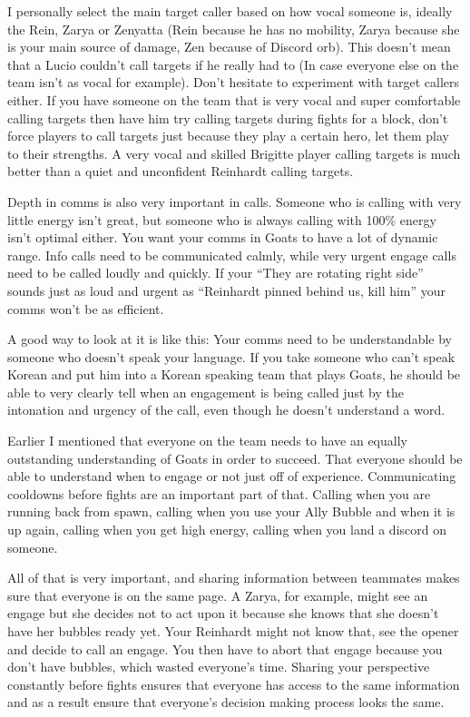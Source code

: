 I personally select the main target caller based on how vocal someone is, ideally the Rein, Zarya or Zenyatta (Rein because he has no mobility, Zarya because she is your main source of damage, Zen because of Discord orb). This doesn’t mean that a Lucio couldn’t call targets if he really had to (In case everyone else on the team isn’t as vocal for example). Don’t hesitate to experiment with target callers either. If you have someone on the team that is very vocal and super comfortable calling targets then have him try calling targets during fights for a block, don’t force players to call targets just because they play a certain hero, let them play to their strengths. A very vocal and skilled Brigitte player calling targets is much better than a quiet and unconfident Reinhardt calling targets.

Depth in comms is also very important in calls. Someone who is calling with very little energy isn’t great, but someone who is always calling with 100\% energy isn’t optimal either. You want your comms in Goats to have a lot of dynamic range. Info calls need to be communicated calmly, while very urgent engage calls need to be called loudly and quickly. If your “They are rotating right side” sounds just as loud and urgent as “Reinhardt pinned behind us, kill him” your comms won’t be as efficient.




A good way to look at it is like this: Your comms need to be understandable by someone who doesn’t speak your language. If you take someone who can’t speak Korean and put him into a Korean speaking team that plays Goats, he should be able to very clearly tell when an engagement is being called just by the intonation and urgency of the call, even though he doesn’t understand a word. 

Earlier I mentioned that everyone on the team needs to have an equally outstanding understanding of Goats in order to succeed. That everyone should be able to understand when to engage or not just off of experience. Communicating cooldowns before fights are an important part of that. Calling when you are running back from spawn, calling when you use your Ally Bubble and when it is up again, calling when you get high energy, calling when you land a discord on someone.

All of that is very important, and sharing information between teammates makes sure that everyone is on the same page. A Zarya, for example, might see an engage but she decides not to act upon it because she knows that she doesn’t have her bubbles ready yet. Your Reinhardt might not know that, see the opener and decide to call an engage. You then have to abort that engage because you don’t have bubbles, which wasted everyone's time. Sharing your perspective constantly before fights ensures that everyone has access to the same information and as a result ensure that everyone's decision making process looks the same.

